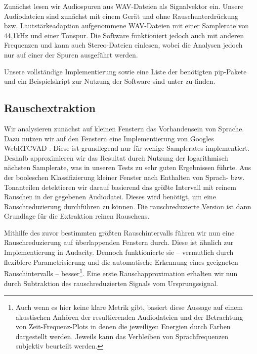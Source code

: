 \documentclass[
	fontsize=10.5pt,
	marginpar=false,
	ngerman,
	accentcolor=3d
	]{tudapub}
\begin{document}
Zunächst lesen wir Audiospuren aus WAV-Dateien als Signalvektor ein. Unsere Audiodateien sind zunächst mit einem Gerät und ohne Rauschunterdrückung bzw. Lautstärkeadaption aufgenommene WAV-Dateien mit einer Samplerate von 44,1kHz und einer Tonspur. Die Software funktioniert jedoch auch mit anderen Frequenzen und kann auch Stereo-Dateien einlesen, wobei die Analysen jedoch nur auf einer der Spuren ausgeführt werden.

Unsere vollständige Implementierung sowie eine Liste der benötigten pip-Pakete und ein Beispielskript zur Nutzung der Software sind unter \cite{blumer_polltip4fm_2020} zu finden.

\subsection{Rauschextraktion}
\label{noiseremove}

Wir analysieren zunächst auf kleinen Fenstern das Vorhandensein von Sprache. Dazu nutzen wir auf den Fenstern eine Implementierung von Googles WebRTCVAD \cite{wiseman_webrtcvad_nodate}. Diese ist grundlegend nur für wenige Samplerates implementiert. Deshalb approximieren wir das Resultat durch Nutzung der logarithmisch nächsten Samplerate, was in unseren Tests zu sehr guten Ergebnissen führte. Aus der booleschen Klassifizierung kleiner Fenster nach Enthalten von Sprach- bzw. Tonanteilen detektieren wir darauf basierend das größte Intervall mit reinem Rauschen in der gegebenen Audiodatei. Dieses wird benötigt, um eine Rauschreduzierung durchführen zu können. Die rauschreduzierte Version ist dann Grundlage für die Extraktion reinen Rauschens.

Mithilfe des zuvor bestimmten größten Rauschintervalls führen wir nun eine Rauschreduzierung auf überlappenden Fenstern durch. Diese ist ähnlich zur Implementierung in Audacity. Dennoch funktionierte sie – vermutlich durch flexiblere Parametrisierung und die automatische Erkennung eines geeigneten Rauschintervalls – besser\footnote{Auch wenn es hier keine klare Metrik gibt, basiert diese Aussage auf einem akustischen Anhören der resultierenden Audiodateien und der Betrachtung von Zeit-Frequenz-Plots in denen die jeweiligen Energien durch Farben dargestellt werden. Jeweils kann das Verbleiben von Sprachfrequenzen subjektiv beurteilt werden.}. Eine erste Rauschapproximation erhalten wir nun durch Subtraktion des rauschreduzierten Signals vom Ursprungssignal.
\end{document}
